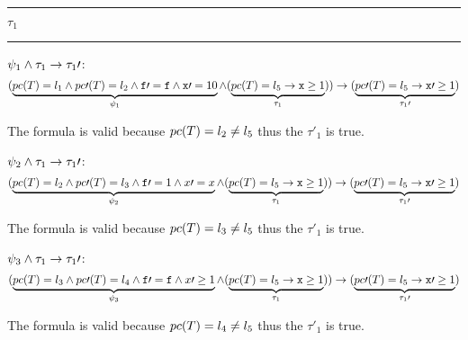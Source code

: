 \begin{center}\rule{4cm}{0.4pt}  $\tau_1$  \rule{4cm}{0.4pt}\end{center}
	
	 $\psi_1 \wedge \tau_1 \to \tau_1\prime $:
	\begin{equation*}
		(
			\underbrace{pc(T) = l_1 \wedge pc\prime (T) = l_2 \wedge \mathtt{f\prime =f} \wedge \mathtt{x}\prime  = 10}_{\psi_1} \wedge (\underbrace{pc(T) = l_5 \to \mathtt{x}\geq 1}_{\tau_1})
		) 
				\to(\underbrace{pc\prime (T) = l_5 \to \mathtt{x}\prime  \geq 1}_{\tau_1\prime })\\\\
	\end{equation*}


	The formula is valid because $pc(T) = l_2 \neq l_5$ thus the $\tau\prime _1$ is true.

	 $\psi_2 \wedge \tau_1 \to \tau_1\prime $:
	\begin{equation*}
		(
			\underbrace{pc(T) = l_2 \wedge pc\prime (T) = l_3 \wedge \mathtt{f}\prime  = 1 \wedge x\prime =x}_{\psi_2} \wedge (\underbrace{pc(T) = l_5 \to \mathtt{x}\geq 1}_{\tau_1})
		) 
			\to(\underbrace{pc\prime (T) = l_5 \to \mathtt{x}\prime  \geq 1}_{\tau_1\prime })\\\\
	\end{equation*}


	The formula is valid because $pc(T) = l_3 \neq l_5$ thus the $\tau\prime _1$ is true.

	 $\psi_3 \wedge \tau_1 \to \tau_1\prime $:
	\begin{equation*}
		(
			\underbrace{pc(T) = l_3 \wedge pc\prime (T) = l_4 \wedge \mathtt{f\prime =f} \wedge x\prime \geq 1}_{\psi_3} \wedge (\underbrace{pc(T) = l_5 \to \mathtt{x}\geq 1}_{\tau_1})
		) 
			\to(\underbrace{pc\prime (T) = l_5 \to \mathtt{x}\prime  \geq 1}_{\tau_1\prime })\\\\
	\end{equation*}

		The formula is valid because $pc(T) = l_4 \neq l_5$ thus the $\tau\prime _1$ is true.

